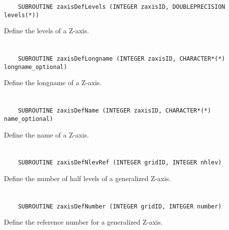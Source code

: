 \begin{verbatim}
    SUBROUTINE zaxisDefLevels (INTEGER zaxisID, DOUBLEPRECISION levels(*))
\end{verbatim}

Define the levels of a Z-axis.


\section*{\tt {}}

\begin{verbatim}
    SUBROUTINE zaxisDefLongname (INTEGER zaxisID, CHARACTER*(*) longname_optional)
\end{verbatim}

Define the longname of a Z-axis.


\section*{\tt {}}

\begin{verbatim}
    SUBROUTINE zaxisDefName (INTEGER zaxisID, CHARACTER*(*) name_optional)
\end{verbatim}

Define the name of a Z-axis.


\section*{\tt {}}

\begin{verbatim}
    SUBROUTINE zaxisDefNlevRef (INTEGER gridID, INTEGER nhlev)
\end{verbatim}

Define the number of half levels of a generalized Z-axis.


\section*{\tt {}}

\begin{verbatim}
    SUBROUTINE zaxisDefNumber (INTEGER gridID, INTEGER number)
\end{verbatim}

Define the reference number for a generalized Z-axis.


\section*{\tt {}}

